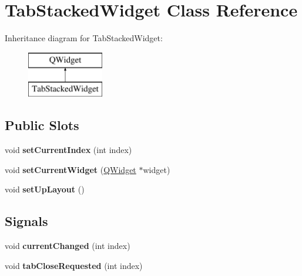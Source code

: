 \hypertarget{class_tab_stacked_widget}{
\section{TabStackedWidget Class Reference}
\label{class_tab_stacked_widget}
}
Inheritance diagram for TabStackedWidget:\begin{figure}[H]
\begin{center}
\leavevmode
\includegraphics[height=2cm]{class_tab_stacked_widget}
\end{center}
\end{figure}
\subsection*{Public Slots}
\begin{DoxyCompactItemize}
\item 
\hypertarget{class_tab_stacked_widget_a74183fe7bd0f0ff5fcc57ba1435236cc}{
void {\bfseries setCurrentIndex} (int index)}
\label{class_tab_stacked_widget_a74183fe7bd0f0ff5fcc57ba1435236cc}

\item 
\hypertarget{class_tab_stacked_widget_ae8779463e03448a6336006e23944a534}{
void {\bfseries setCurrentWidget} (\hyperlink{class_q_widget}{QWidget} $\ast$widget)}
\label{class_tab_stacked_widget_ae8779463e03448a6336006e23944a534}

\item 
\hypertarget{class_tab_stacked_widget_a3b3cba2736761f0ef10ef15e50904f33}{
void {\bfseries setUpLayout} ()}
\label{class_tab_stacked_widget_a3b3cba2736761f0ef10ef15e50904f33}

\end{DoxyCompactItemize}
\subsection*{Signals}
\begin{DoxyCompactItemize}
\item 
\hypertarget{class_tab_stacked_widget_a9378f9c896957d9bb37bc6fdc180981c}{
void {\bfseries currentChanged} (int index)}
\label{class_tab_stacked_widget_a9378f9c896957d9bb37bc6fdc180981c}

\item 
\hypertarget{class_tab_stacked_widget_af615c93acb887e3291a705935b87fb86}{
void {\bfseries tabCloseRequested} (int index)}
\label{class_tab_stacked_widget_af615c93acb887e3291a705935b87fb86}

\end{DoxyCompactItemize}
